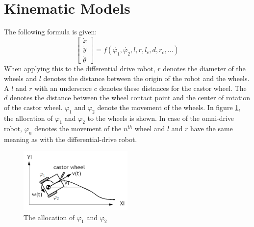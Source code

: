 \documentclass[12pt]{article}
\begin{document}
\section{Kinematic Models}
The following formula is given: 
\begin{equation}
    \begin{bmatrix} 
        \dot{x} \\ 
        \dot{y} \\ 
        \dot{\theta}
    \end{bmatrix} 
    = f(\dot{\varphi_1}, \dot{\varphi_2}, l, r, l_c, d, r_c, \ldots)
    \label{start}
\end{equation}
When applying this to the differential drive robot, $r$ denotes the diameter of the wheels and $l$ denotes the distance between the origin of the robot and the wheels. A $l$ and $r$ with an underscore $c$ denotes these distances for the castor wheel. The $d$ denotes the distance between the wheel contact point and the center of rotation of the castor wheel. $\varphi_1$ and $\varphi_2$ denote the movement of the wheels. In figure \ref{wheels}, the allocation of $\varphi_1$ and $\varphi_2$ to the wheels is shown. In case of the omni-drive robot, $\varphi_n$ denotes the movement of the $n^{th}$ wheel and $l$ and $r$ have the same meaning as with the differential-drive robot.
\begin{figure}[h!]
    \centering
    \includegraphics[width=0.5\textwidth]{wheels.png}
    \caption{The allocation of $\varphi_1$ and $\varphi_2$}
    \label{wheels}
\end{figure}
\clearpage
\end{document}

